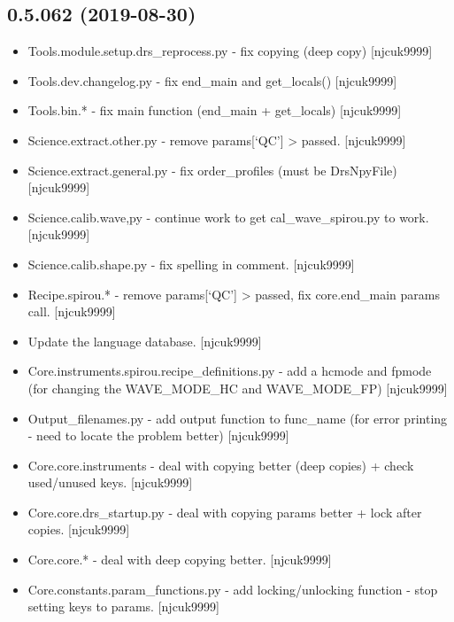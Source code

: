 \documentclass[a4paper,10pt,english]{report}
\begin{document}
\subsection{0.5.062 (2019-08-30)}
\label{\detokenize{misc/changelog:id79}}\begin{itemize}
\item {} 
Tools.module.setup.drs\_reprocess.py - fix copying (deep copy)
{[}njcuk9999{]}

\item {} 
Tools.dev.changelog.py - fix end\_main and get\_locals() {[}njcuk9999{]}

\item {} 
Tools.bin.* - fix main function (end\_main + get\_locals) {[}njcuk9999{]}

\item {} 
Science.extract.other.py - remove params{[}‘QC’{]} \textendash{}\textgreater{} passed. {[}njcuk9999{]}

\item {} 
Science.extract.general.py - fix order\_profiles (must be DrsNpyFile)
{[}njcuk9999{]}

\item {} 
Science.calib.wave,py - continue work to get cal\_wave\_spirou.py to
work. {[}njcuk9999{]}

\item {} 
Science.calib.shape.py - fix spelling in comment. {[}njcuk9999{]}

\item {} 
Recipe.spirou.* - remove params{[}‘QC’{]} \textendash{}\textgreater{} passed, fix core.end\_main
params call. {[}njcuk9999{]}

\item {} 
Update the language database. {[}njcuk9999{]}

\item {} 
Core.instruments.spirou.recipe\_definitions.py - add a hcmode and
fpmode (for changing the WAVE\_MODE\_HC and WAVE\_MODE\_FP) {[}njcuk9999{]}

\item {} 
Output\_filenames.py - add output function to func\_name (for error
printing - need to locate the problem better) {[}njcuk9999{]}

\item {} 
Core.core.instruments - deal with copying better (deep copies) + check
used/unused keys. {[}njcuk9999{]}

\item {} 
Core.core.drs\_startup.py - deal with copying params better + lock
after copies. {[}njcuk9999{]}

\item {} 
Core.core.* - deal with deep copying better. {[}njcuk9999{]}

\item {} 
Core.constants.param\_functions.py - add locking/unlocking function -
stop setting keys to params. {[}njcuk9999{]}

\end{itemize}
\end{document}
